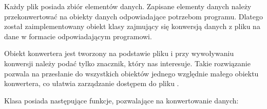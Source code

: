 
\par
Każdy plik \DICOM posiada zbiór elementów danych.
Zapisane elementy danych należy przekonwertować na obiekty danych odpowiadające potrzebom programu.
Dlatego został zaimplementowany obiekt klasy  zajmujący się konwersją danych z pliku \DICOM na dane w formacie odpowiadającym programowi.

\par
Obiekt konwertera jest tworzony na podstawie pliku \DICOM i przy wywoływaniu konwersji należy podać tylko znacznik, który nas interesuje.
Takie rozwiązanie pozwala na przesłanie do wszystkich obiektów jednego względnie małego obiektu konwertera, co ułatwia zarządzanie dostępem do pliku \DICOM.

\par
Klasa  posiada następujące funkcje, pozwalające na konwertowanie danych:
